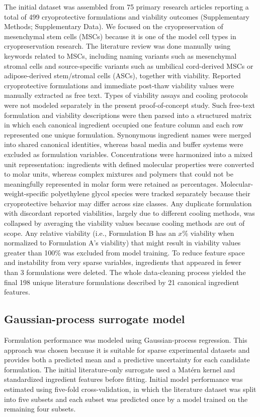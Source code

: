\documentclass[11pt]{article}
\begin{document}
The initial dataset was assembled from 75 primary research articles reporting a total of 499 cryoprotective formulations and viability outcomes (Supplementary Methods; Supplementary Data). We focused on the cryopreservation of mesenchymal stem cells (MSCs) because it is one of the model cell types in cryopreservation research. The literature review was done manually using keywords related to MSCs, including naming variants such as mesenchymal stromal cells and source-specific variants such as umbilical cord-derived MSCs or adipose-derived stem/stromal cells (ASCs), together with viability. Reported cryoprotective formulations and immediate post-thaw viability values were manually extracted as free text. Types of viability assays and cooling protocols were not modeled separately in the present proof-of-concept study. Such free-text formulation and viability descriptions were then parsed into a structured matrix in which each canonical ingredient occupied one feature column and each row represented one unique formulation. Synonymous ingredient names were merged into shared canonical identities, whereas basal media and buffer systems were excluded as formulation variables. Concentrations were harmonized into a mixed unit representation: ingredients with defined molecular properties were converted to molar units, whereas complex mixtures and polymers that could not be meaningfully represented in molar form were retained as percentages. Molecular-weight-specific polyethylene glycol species were tracked separately because their cryoprotective behavior may differ across size classes. Any duplicate formulation with discordant reported viabilities, largely due to different cooling methods, was collapsed by averaging the viability values because cooling methods are out of scope. Any relative viability (i.e., Formulation B has an $x$\% viability when normalized to Formulation A's viability) that might result in viability values greater than 100\% was excluded from model training. To reduce feature space and instability from very sparse variables, ingredients that appeared in fewer than 3 formulations were deleted. The whole data-cleaning process yielded the final 198 unique literature formulations described by 21 canonical ingredient features.

\subsection{Gaussian-process surrogate model}

Formulation performance was modeled using Gaussian-process regression. This approach was chosen because it is suitable for sparse experimental datasets and provides both a predicted mean and a predictive uncertainty for each candidate formulation. The initial literature-only surrogate used a Mat\'{e}rn kernel and standardized ingredient features before fitting. Initial model performance was estimated using five-fold cross-validation, in which the literature dataset was split into five subsets and each subset was predicted once by a model trained on the remaining four subsets.
\end{document}
